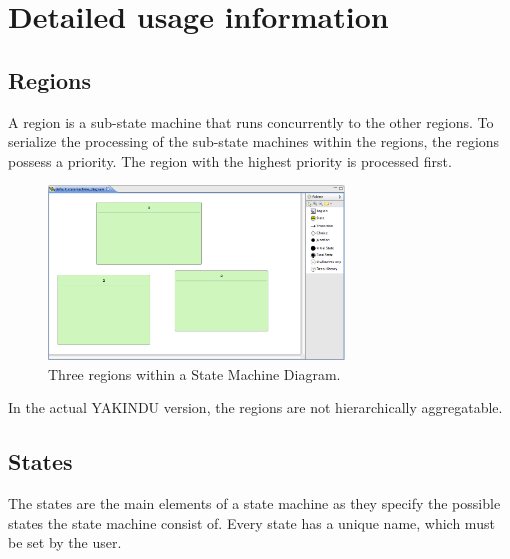 %
\section{Detailed usage information}

\subsection{Regions}
\label{sec:Regions}

A region is a sub-state machine that runs concurrently to the other regions. To
serialize the processing of the sub-state machines within the regions, the
regions possess a priority. The region with the highest priority is processed
first.

\begin{figure}[ht] \center
\includegraphics[width=0.7\textwidth]{./Pictures/RegionsPlain}
\caption{\label{fig:RegionsPlain}Three regions within a State Machine Diagram.}
\end{figure}

In the actual YAKINDU version, the regions are not hierarchically aggregatable.
  
\subsection{States}
\label{sec:States}

The states are the main elements of a state machine as they specify the possible
states the state machine consist of. Every state has a unique name, which must be
set by the user.

